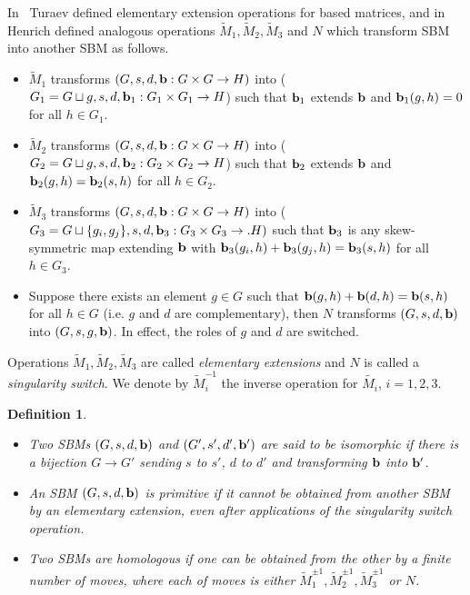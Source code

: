 \documentclass[11pt]{amsart}
\theoremstyle{noparens}
\newtheorem{definition}{Definition}[section]
\numberwithin{equation}{section}
\numberwithin{equation}{section}
\begin{document}
In~\cite{Tur2} Turaev defined elementary extension operations for based matrices, and in~\cite{Hen} Henrich defined analogous operations $\widetilde{M}_1, \widetilde{M}_2, \widetilde{M}_3$ and $N$ which transform SBM into another SBM as follows. 
 
\begin{itemize}
\item $\widetilde{M}_1$ transforms $(G, s, d, {\bf b} : G \times G \to H)$ into ($G_1 = G \sqcup {g}, s, d, {\bf b}_1 : G_1 \times G_1 \to H$) such that ${\bf b}_1$ extends ${\bf b}$ and ${\bf b}_1(g, h) = 0$ for all $h \in G_1$. 
\item $\widetilde{M}_2$ transforms $(G, s, d, {\bf b} : G \times G \to H)$ into ($G_2 = G \sqcup {g}, s, d, {\bf b}_2 : G_2 \times G_2 \to H$) such that ${\bf b}_2$ extends ${\bf b}$ and ${\bf b}_2(g, h) = {\bf b}_2(s, h)$ for all $h\in G_2.$ 
\item $\widetilde{M}_3$ transforms $(G, s, d, {\bf b} : G \times G \to H)$ into  ($G_3 = G \sqcup \{g_i, g_j\}, s, d, {\bf b}_3 : G_3 \times G_3 \to. H)$ such that ${\bf b}_3$ is any skew-symmetric map extending ${\bf b}$ with ${\bf b}_3(g_i, h) + {\bf b}_3(g_j, h) = {\bf b}_3(s, h)$ for all $h\in G_3$. 
\item Suppose there exists an element $g\in G$ such that ${\bf b}(g, h) + {\bf b}(d, h) = {\bf b}(s, h)$ for
all $h\in G$ (i.e. $g$ and $d$ are complementary), then $N$ transforms $(G, s, d, {\bf b})$ into $(G, s, g, {\bf b})$. In effect, the roles of $g$ and $d$ are switched.
\end{itemize}
Operations  $\widetilde{M}_1, \widetilde{M}_2, \widetilde{M}_3$ are called \textit{elementary extensions}  and $N$ is called a \textit{singularity switch}. We denote by $\widetilde{M}_i^{-1}$ the inverse operation for $\widetilde{M_i}$, $i=1,2,3$. 

\begin{definition} \cite[Def.~4.9]{Hen} \label{def:primitive} 
{\rm 
\begin{itemize}
\item[(i)] Two SBMs $(G, s, d, {\bf b})$ and $(G', s', d', {\bf b}')$ are said to be \textit{isomorphic} if there is a bijection $G\to G'$ sending $s$ to $s'$, $d$ to $d'$ and transforming ${\bf b}$ into ${\bf b}'$. 
\item[(ii)] An SBM $(G, s, d, {\bf b})$ is \textit{primitive} if it cannot be obtained from another SBM by an elementary extension, even after applications of the singularity switch operation. 
\item[(iii)] Two SBMs are \textit{homologous} if one can be obtained from the other by a finite number of moves, where each of moves is either $\widetilde{M}_1^{\pm 1}, \widetilde{M}_2^{\pm 1}, \widetilde{M}_3^{\pm 1}$ or $N$.
\end{itemize}
}
\end{definition}
\end{document}
